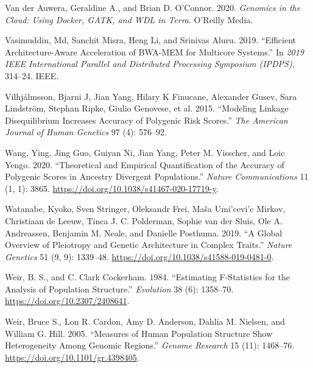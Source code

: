 \documentclass[
]{book}
\newlength{\cslhangindent}
\newlength{\cslentryspacingunit} %
\newenvironment{CSLReferences}[2] %
 {%
  \setlength{\parindent}{0pt}
  \ifodd #1
  \let\oldpar\par
  \def\par{\hangindent=\cslhangindent\oldpar}
  \fi
  \setlength{\parskip}{#2\cslentryspacingunit}
 }%
 {}
\begin{document}
\begin{CSLReferences}{1}{0}
\leavevmode{}%
Van der Auwera, Geraldine A., and Brian D. O'Connor. 2020. \emph{Genomics in the Cloud: Using {Docker}, {GATK}, and {WDL} in {Terra}}. {O'Reilly Media}.

\leavevmode{}%
Vasimuddin, Md, Sanchit Misra, Heng Li, and Srinivas Aluru. 2019. {``Efficient Architecture-Aware Acceleration of {BWA-MEM} for Multicore Systems.''} In \emph{2019 {IEEE International Parallel} and {Distributed Processing Symposium} ({IPDPS})}, 314--24. {IEEE}.

\leavevmode{}%
Vilhjálmsson, Bjarni J, Jian Yang, Hilary K Finucane, Alexander Gusev, Sara Lindström, Stephan Ripke, Giulio Genovese, et al. 2015. {``Modeling Linkage Disequilibrium Increases Accuracy of Polygenic Risk Scores.''} \emph{The American Journal of Human Genetics} 97 (4): 576--92.

\leavevmode{}%
Wang, Ying, Jing Guo, Guiyan Ni, Jian Yang, Peter M. Visscher, and Loic Yengo. 2020. {``Theoretical and Empirical Quantification of the Accuracy of Polygenic Scores in Ancestry Divergent Populations.''} \emph{Nature Communications} 11 (1, 1): 3865. \url{https://doi.org/10.1038/s41467-020-17719-y}.

\leavevmode{}%
Watanabe, Kyoko, Sven Stringer, Oleksandr Frei, Maša Umi'cevi'c Mirkov, Christiaan de Leeuw, Tinca J. C. Polderman, Sophie van der Sluis, Ole A. Andreassen, Benjamin M. Neale, and Danielle Posthuma. 2019. {``A Global Overview of Pleiotropy and Genetic Architecture in Complex Traits.''} \emph{Nature Genetics} 51 (9, 9): 1339--48. \url{https://doi.org/10.1038/s41588-019-0481-0}.

\leavevmode{}%
Weir, B. S., and C. Clark Cockerham. 1984. {``Estimating {F-Statistics} for the {Analysis} of {Population Structure}.''} \emph{Evolution} 38 (6): 1358--70. \url{https://doi.org/10.2307/2408641}.

\leavevmode{}%
Weir, Bruce S., Lon R. Cardon, Amy D. Anderson, Dahlia M. Nielsen, and William G. Hill. 2005. {``Measures of Human Population Structure Show Heterogeneity Among Genomic Regions.''} \emph{Genome Research} 15 (11): 1468--76. \url{https://doi.org/10.1101/gr.4398405}.


\end{CSLReferences}
\end{document}
